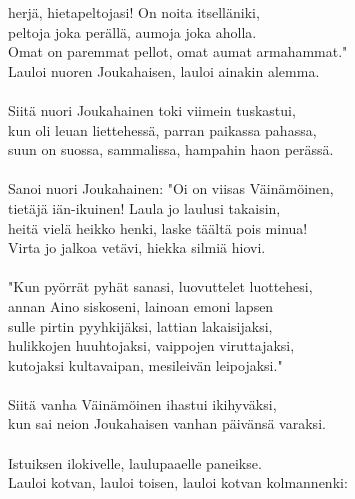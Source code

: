 herjä, hietapeltojasi! On noita itselläniki,                  \\
peltoja joka perällä, aumoja joka aholla.                     \\
Omat on paremmat pellot, omat aumat armahammat."              \\
Lauloi nuoren Joukahaisen, lauloi ainakin alemma.             \\
                                                              \\
Siitä nuori Joukahainen toki viimein tuskastui,               \\
kun oli leuan liettehessä, parran paikassa pahassa,           \\
suun on suossa, sammalissa, hampahin haon perässä.            \\
                                                              \\
Sanoi nuori Joukahainen: "Oi on viisas Väinämöinen,           \\
tietäjä iän-ikuinen! Laula jo laulusi takaisin,               \\
heitä vielä heikko henki, laske täältä pois minua!            \\
Virta jo jalkoa vetävi, hiekka silmiä hiovi.                  \\
                                                              \\
"Kun pyörrät pyhät sanasi, luovuttelet luottehesi,            \\
annan Aino siskoseni, lainoan emoni lapsen                    \\
sulle pirtin pyyhkijäksi, lattian lakaisijaksi,               \\
hulikkojen huuhtojaksi, vaippojen viruttajaksi,               \\
kutojaksi kultavaipan, mesileivän leipojaksi."                \\
                                                              \\
Siitä vanha Väinämöinen ihastui ikihyväksi,                   \\
kun sai neion Joukahaisen vanhan päivänsä varaksi.            \\
                                                              \\
Istuiksen ilokivelle, laulupaaelle paneikse.                  \\
Lauloi kotvan, lauloi toisen, lauloi kotvan kolmannenki:      \\
